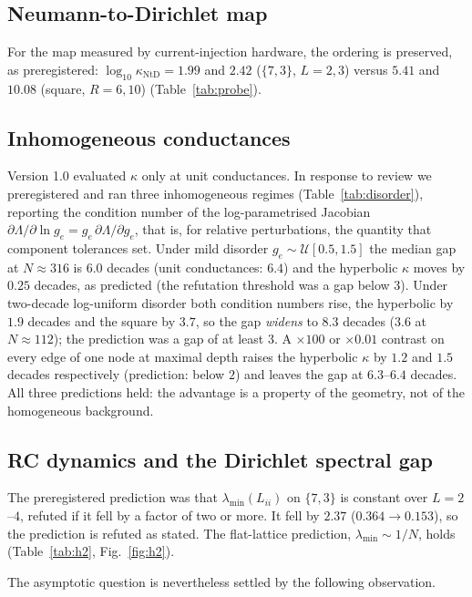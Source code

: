 \documentclass[11pt,a4paper]{article}
\begin{document}
\subsection{Neumann-to-Dirichlet map}
For the map measured by current-injection hardware, the ordering is preserved, as preregistered:
$\log_{10}\kappa_{\mathrm{NtD}} = 1.99$ and $2.42$ ($\{7,3\}$, $L=2,3$) versus $5.41$ and $10.08$ (square,
$R=6,10$) (Table~\ref{tab:probe}).

\subsection{Inhomogeneous conductances}
\label{sec:disorder}
Version 1.0 evaluated $\kappa$ only at unit conductances. In response to review we preregistered and ran three
inhomogeneous regimes (Table~\ref{tab:disorder}), reporting the condition number of the log-parametrised Jacobian
$\partial\Lambda/\partial\ln g_e = g_e\,\partial\Lambda/\partial g_e$, that is, for relative perturbations, the
quantity that component tolerances set. Under mild disorder $g_e\sim\mathcal U[0.5,1.5]$ the median gap at
$N\approx316$ is $6.0$ decades (unit conductances: $6.4$) and the hyperbolic $\kappa$ moves by $0.25$ decades, as
predicted (the refutation threshold was a gap below $3$). Under two-decade log-uniform disorder both condition
numbers rise, the hyperbolic by $1.9$ decades and the square by $3.7$, so the gap \emph{widens} to $8.3$ decades
($3.6$ at $N\approx112$); the prediction was a gap of at least $3$. A $\times100$ or $\times0.01$ contrast on every
edge of one node at maximal depth raises the hyperbolic $\kappa$ by $1.2$ and $1.5$ decades respectively
(prediction: below $2$) and leaves the gap at $6.3$--$6.4$ decades. All three predictions held: the advantage is a
property of the geometry, not of the homogeneous background.

\subsection{RC dynamics and the Dirichlet spectral gap}
\label{sec:h2}
The preregistered prediction was that $\lambda_{\min}(L_{ii})$ on $\{7,3\}$ is constant over $L=2$--$4$, refuted
if it fell by a factor of two or more. It fell by $2.37$ ($0.364\to0.153$), so the prediction is refuted as
stated. The flat-lattice prediction, $\lambda_{\min}\sim1/N$, holds (Table~\ref{tab:h2}, Fig.~\ref{fig:h2}).

The asymptotic question is nevertheless settled by the following observation.
\end{document}
